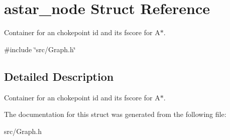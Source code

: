 \hypertarget{structastar__node}{}\section{astar\+\_\+node Struct Reference}
\label{structastar__node}


Container for an chokepoint id and its fscore for A$\ast$.  




{\ttfamily \#include \char`\"{}src/\+Graph.\+h\char`\"{}}



\subsection{Detailed Description}
Container for an chokepoint id and its fscore for A$\ast$. 

The documentation for this struct was generated from the following file\+:\begin{DoxyCompactItemize}
\item 
src/Graph.\+h\end{DoxyCompactItemize}
